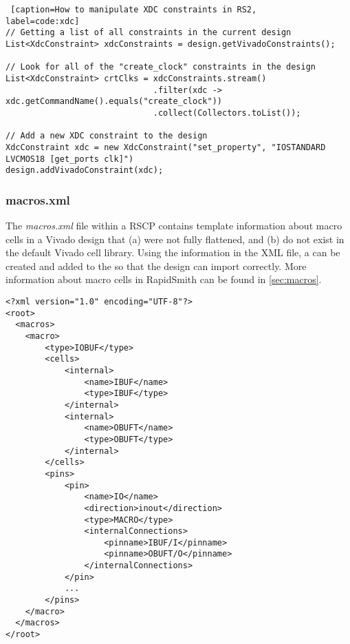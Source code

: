 \begin{lstlisting} [caption=How to manipulate XDC constraints in RS2,
label=code:xdc] 
// Getting a list of all constraints in the current design
List<XdcConstraint> xdcConstraints = design.getVivadoConstraints();

// Look for all of the "create_clock" constraints in the design
List<XdcConstraint> crtClks = xdcConstraints.stream()
                              .filter(xdc -> xdc.getCommandName().equals("create_clock")) 
                              .collect(Collectors.toList());

// Add a new XDC constraint to the design
XdcConstraint xdc = new XdcConstraint("set_property", "IOSTANDARD LVCMOS18 [get_ports clk]") 
design.addVivadoConstraint(xdc);
\end{lstlisting}

\subsubsection{macros.xml}

The \textit{macros.xml} file within a RSCP contains template information about
macro cells in a Vivado design that (a) were not fully flattened, and (b) do not
exist in the default Vivado cell library. Using the information in the XML file,
a  can be created and added to the  so that
the design can import correctly. More information about macro cells in
RapidSmith can be found in \autoref{sec:macros}.

\begin{lstlisting}[numbers=none]
<?xml version="1.0" encoding="UTF-8"?>
<root>
  <macros>
    <macro>
        <type>IOBUF</type>
        <cells>
            <internal>
                <name>IBUF</name>
                <type>IBUF</type>
            </internal>
            <internal>
                <name>OBUFT</name>
                <type>OBUFT</type>
            </internal>
        </cells>
        <pins>
            <pin>
                <name>IO</name>
                <direction>inout</direction>
                <type>MACRO</type>
                <internalConnections>
                    <pinname>IBUF/I</pinname>
                    <pinname>OBUFT/O</pinname>
                </internalConnections>
            </pin>
            ...
        </pins>
    </macro>
  </macros>
</root>  
\end{lstlisting}


